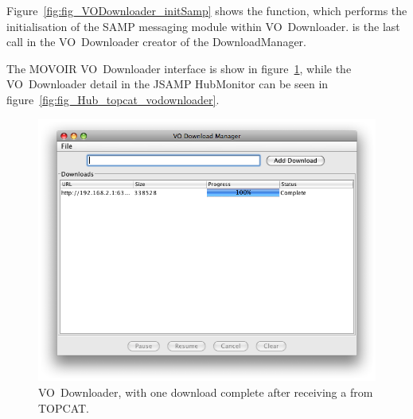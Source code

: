 			Figure~\ref{fig:fig_VODownloader_initSamp} shows the
			\initSamp{} function, which performs the
			initialisation of the SAMP messaging module within
			VO~Downloader. \initSamp{} is the last call in
			the VO~Downloader creator of the DownloadManager.
			
			The MOVOIR VO~Downloader interface is show in 
			figure~\ref{fig:fig_VODownloader}, while the
			VO~Downloader detail in the JSAMP HubMonitor can be
			seen in figure~\ref{fig:fig_Hub_topcat_vodownloader}.
			
			\begin{figure}[tbp]
				\centering
					\includegraphics[height=0.4\textheight]
					{fig/VODownloader.png}
				\caption[VO Downloader receiving a VOTable]
				{
					VO~Downloader, with one download complete after
					receiving a  from
					TOPCAT.
				}
				\label{fig:fig_VODownloader}
			\end{figure}
			
